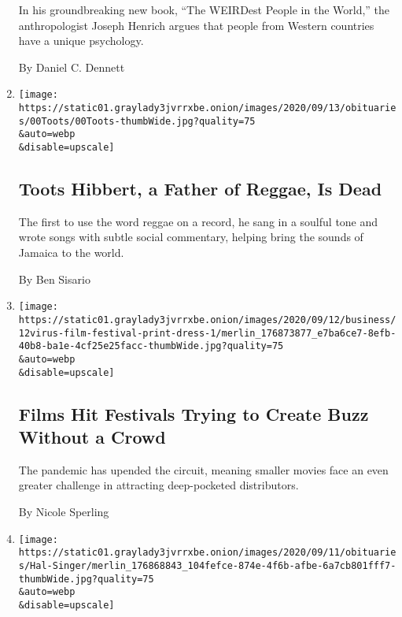 \begin{enumerate}
  In his groundbreaking new book, ``The WEIRDest People in the World,''
  the anthropologist Joseph Henrich argues that people from Western
  countries have a unique psychology.

  By Daniel C. Dennett
\item
  \href{/2020/09/12/arts/music/toots-hibbert-dead.html}{}

  \texttt{[image: https://static01.graylady3jvrrxbe.onion/images/2020/09/13/obituaries/00Toots/00Toots-thumbWide.jpg?quality=75\\\&auto=webp\\\&disable=upscale]}

  \hypertarget{toots-hibbert-a-father-of-reggae-is-dead}{%
  \subsection{Toots Hibbert, a Father of Reggae, Is
  Dead}\label{toots-hibbert-a-father-of-reggae-is-dead}}

  The first to use the word reggae on a record, he sang in a soulful
  tone and wrote songs with subtle social commentary, helping bring the
  sounds of Jamaica to the world.

  By Ben Sisario
\item
  \href{/2020/09/12/business/media/concrete-cowboy-toronto-film-festival.html}{}

  \texttt{[image: https://static01.graylady3jvrrxbe.onion/images/2020/09/12/business/12virus-film-festival-print-dress-1/merlin\_176873877\_e7ba6ce7-8efb-40b8-ba1e-4cf25e25facc-thumbWide.jpg?quality=75\\\&auto=webp\\\&disable=upscale]}

  \hypertarget{films-hit-festivals-trying-to-create-buzz-without-a-crowd}{%
  \subsection{Films Hit Festivals Trying to Create Buzz Without a
  Crowd}\label{films-hit-festivals-trying-to-create-buzz-without-a-crowd}}

  The pandemic has upended the circuit, meaning smaller movies face an
  even greater challenge in attracting deep-pocketed distributors.

  By Nicole Sperling
\item
  \href{/2020/09/11/arts/music/hal-singer-dead.html}{}

  \texttt{[image: https://static01.graylady3jvrrxbe.onion/images/2020/09/11/obituaries/Hal-Singer/merlin\_176868843\_104fefce-874e-4f6b-afbe-6a7cb801fff7-thumbWide.jpg?quality=75\\\&auto=webp\\\&disable=upscale]}


\end{enumerate}
